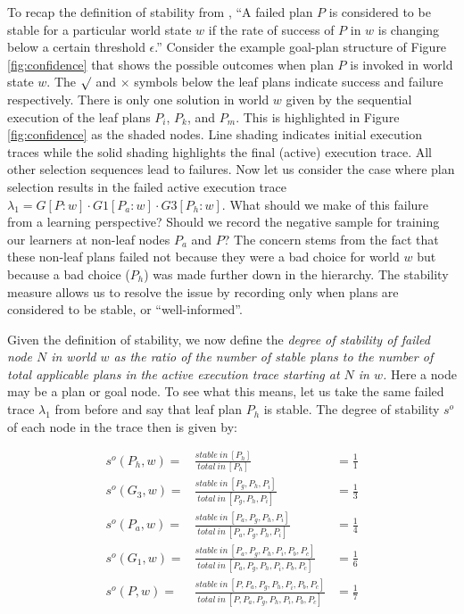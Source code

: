 To recap the definition of stability from \cite{singh10:extending}, ``A failed plan $P$ is considered to be stable for a particular world state $w$ if the rate of success of $P$ in $w$ is changing below a certain threshold $\epsilon$.'' Consider the example goal-plan structure of Figure \ref{fig:confidence} that shows the possible outcomes when plan $P$ is invoked in world state $w$. The $\surd$ and $\times$ symbols below the leaf plans indicate success and failure respectively. There is only one solution in world $w$ given by the sequential execution of the leaf plans $P_i$, $P_k$, and $P_m$. This is highlighted in Figure \ref{fig:confidence} as the shaded nodes. Line shading indicates initial execution traces while the solid shading highlights the final (active) execution trace. All other selection sequences lead to failures. Now let us consider the case where plan selection results in the failed active execution trace $\lambda_1=G[P:w] \cdot G1[P_a:w] \cdot G3[P_h:w]$. What should we make of this failure from a learning perspective? Should we record the negative sample for training our learners at non-leaf nodes $P_a$ and $P$? The concern stems from the fact that these non-leaf plans failed not because they were a bad choice for world $w$ but because a bad choice ($P_h$) was made further down in the hierarchy. The stability measure allows us to resolve the issue by recording only when plans are considered to be stable, or ``well-informed''. 

Given the definition of stability, we now define the {\em degree of stability of failed node $N$ in world $w$ as the ratio of the number of stable plans to the number of total applicable plans in the active execution trace starting at $N$ in $w$.} Here a node may be a plan or goal node. To see what this means, let us take the same failed trace $\lambda_1$ from before and say that leaf plan $P_h$ is stable. The degree of stability $s^o$ of each node in the trace then is given by:

\begin{eqnarray*}
s^o(P_h,w) = & \frac{stable~in~[P_h]}{total~in~[P_h]} & = \frac{1}{1}  \\
s^o(G_3,w) = & \frac{stable~in~[P_g,P_h,P_i]}{total~in~[P_g,P_h,P_i]} & = \frac{1}{3}  \\
s^o(P_a,w) = & \frac{stable~in~[P_a,P_g,P_h,P_i]}{total~in~[P_a,P_g,P_h,P_i]} & = \frac{1}{4} \\
s^o(G_1,w) = & \frac{stable~in~[P_a,P_g,P_h,P_i,P_b,P_c]}{total~in~[P_a,P_g,P_h,P_i,P_b,P_c]} & = \frac{1}{6}  \\
s^o(P,w) = & \frac{stable~in~[P,P_a,P_g,P_h,P_i,P_b,P_c]}{total~in~[P,P_a,P_g,P_h,P_i,P_b,P_c]} & = \frac{1}{7} 
\end{eqnarray*}


